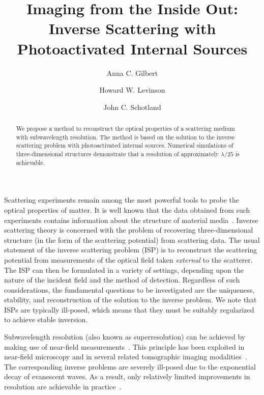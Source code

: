 \documentclass[prl,twocolumn]{revtex4-1}
\begin{document}
\title{Imaging from the Inside Out: \\
 Inverse Scattering with Photoactivated Internal Sources} 

\author{Anna C. Gilbert}

\author{Howard W. Levinson}

\author{John C. Schotland}


\begin{abstract}
We propose a method to reconstruct the optical properties of a scattering medium with subwavelength resolution. The method is based on the solution to the inverse scattering problem with photoactivated internal sources. Numerical simulations of three-dimensional structures demonstrate that a resolution of approximately $\lambda/25 $ is achievable.
\end{abstract} 

\maketitle

Scattering experiments remain among the most powerful tools to probe the optical properties of matter. It is well known that the data obtained from such experiments contains information about the structure of material media~\cite{Born-Wolf}. Inverse scattering theory is concerned with the problem of recovering three-dimensional structure (in the form of the scattering potential) from scattering data. The usual statement of the inverse scattering problem (ISP) is to reconstruct the scattering potential from measurements of the optical field taken \emph{external} to the scatterer. The ISP can then be formulated in a variety of settings, depending upon the nature of the incident field and the method of detection. Regardless of such considerations, the fundamental questions to be investigated are the uniqueness, stability, and reconstruction of the solution to the inverse problem. We note that ISPs are typically ill-posed, which means that they must be suitably regularized to achieve stable inversion.  

Subwavelength resolution (also known as superresolution) can be achieved by making use of near-field measurements~\cite{novotny}. This principle has been exploited in near-field microscopy and in several related tomographic imaging modalities~\cite{carney_2001,carney_2004,govyadinov_2009}. The corresponding inverse problems are severely ill-posed due to the exponential decay of evanescent waves. As a result, only relatively limited improvements in resolution are achievable in practice~\cite{govyadinov}.
 
\end{document}

